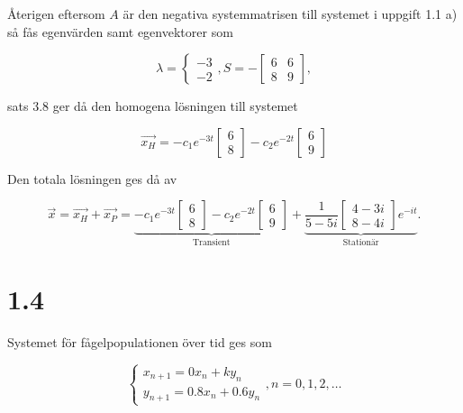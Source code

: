 \documentclass[a4paper]{article}
\newcommand{\mat}[1]{\bm{\mathit{#1}}}
\begin{document}
Återigen eftersom $\mat{A}$ är den negativa systemmatrisen till systemet i
uppgift 1.1 a) så fås egenvärden samt egenvektorer som

\begin{equation*}
  \lambda = \begin{cases}-3\\-2\end{cases}, \mat{S} = -\begin{bmatrix}6 & 6\\8 & 9\end{bmatrix},
\end{equation*}
  
\noindent sats 3.8 ger då den homogena lösningen till systemet

\begin{equation*}
  \vec{x_H} = -c_1e^{-3t}\begin{bmatrix}6\\8\end{bmatrix} - c_2e^{-2t}\begin{bmatrix}6\\9\end{bmatrix}
\end{equation*}

\noindent Den totala lösningen ges då av

\begin{equation*}
  \vec{x} = \vec{x_H} + \vec{x_P} = \underbrace{-c_1e^{-3t}\begin{bmatrix}6\\8\end{bmatrix} - c_2e^{-2t}\begin{bmatrix}6\\9\end{bmatrix}}_{\text{Transient}} + \underbrace{\frac{1}{5-5i}\begin{bmatrix}4-3i\\8-4i\end{bmatrix}e^{-it}}_{\text{Stationär}}.
\end{equation*}

\section*{1.4}

Systemet för fågelpopulationen över tid ges som

\begin{equation*}
  \begin{cases}
    x_{n+1} = 0x_n + ky_n\\
    y_{n+1} = 0.8x_n + 0.6y_n
  \end{cases}, n = 0, 1, 2, \ldots
\end{equation*}
\end{document}
